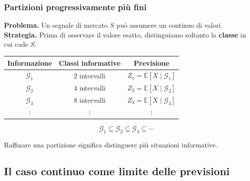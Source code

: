 \documentclass[handout]{beamer}%
\providecommand{\E}{\mathbb{E}}
\providecommand{\G}{\mathcal{G}}
\providecommand{\1}{\mathbf{1}}
\providecommand{\QTR}[2]{\csname #1\endcsname{#2}}
\begin{document}
\begin{frame}%
\frametitle{Partizioni progressivamente pi\`{u} fini}
%


\textbf{Problema.} Un segnale di mercato $S$ pu\`{o} assumere un continuo di
valori. \medskip\textbf{Strategia.} Prima di osservare il valore esatto,
distinguiamo soltanto la \textbf{classe} in cui cade $S$. \medskip

\begin{center}%
\begin{tabular}
[c]{c|c|c}%
Informazione & Classi informative & Previsione\\\hline
$\G_{1}$ & 2 intervalli & $Z_{1}=\E[X\mid\G_1]$\\
$\G_{2}$ & 4 intervalli & $Z_{2}=\E[X\mid\G_2]$\\
$\G_{3}$ & 8 intervalli & $Z_{3}=\E[X\mid\G_3]$\\
$\vdots$ & $\vdots$ & $\vdots$%
\end{tabular}

\end{center}

\medskip%
\[
\G_{1}\subseteq\G_{2}\subseteq\G_{3}\subseteq\cdots
\]


\begin{center}
\textcolor{light-blue}{Raffinare una partizione significa distinguere pi\`{u} situazioni informative.}
\end{center}%

\end{frame}%


\subsection{Il caso continuo come limite delle previsioni}%
\end{document}

